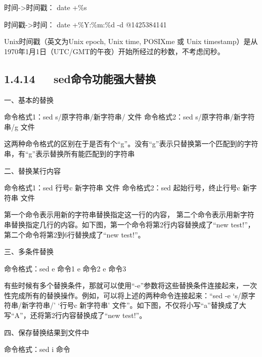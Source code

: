 \documentclass[letterpaper,12pt,english]{sphinxmanual}
\begin{document}
时间-\textgreater{}时间戳： date +\%s

时间戳-\textgreater{}时间： date +\%Y:\%m:\%d -d @1425384141

Unix时间戳（英文为Unix epoch, Unix time, POSIXme 或 Unix timestamp）是从1970年1月1日（UTC/GMT的午夜）开始所经过的秒数，不考虑闰秒。


\subsection{1.4.14   sed命令功能强大替换}
\label{\detokenize{001software/001install/linux:id29}}
一、基本的替换

\begin{sphinxVerbatim}[commandchars=\\\{\}]
命令格式1：sed \PYGZsq{}s/原字符串/新字符串/\PYGZsq{} 文件
命令格式2：sed \PYGZsq{}s/原字符串/新字符串/g\PYGZsq{} 文件
\end{sphinxVerbatim}

这两种命令格式的区别在于是否有个“g”。没有“g”表示只替换第一个匹配到的字符串，有“g”表示替换所有能匹配到的字符串

二、替换某行内容

\begin{sphinxVerbatim}[commandchars=\\\{\}]
命令格式1：sed \PYGZsq{}行号c 新字符串\PYGZsq{} 文件
命令格式2：sed \PYGZsq{}起始行号，终止行号c 新字符串\PYGZsq{} 文件
\end{sphinxVerbatim}

第一个命令表示用新的字符串替换指定这一行的内容， 第二个命令表示用新字符串替换指定几行的内容。如下图，第一个命令将第2行内容替换成了“new test!”，第二个命令将第2到6行替换成了“new test!”。

三、多条件替换

\begin{sphinxVerbatim}[commandchars=\\\{\}]
命令格式：sed \PYGZhy{}e 命令1 \PYGZhy{}e 命令2 \PYGZhy{}e 命令3
\end{sphinxVerbatim}

有些时候有多个替换条件，那就可以使用“-e”参数将这些替换条件连接起来，一次性完成所有的替换操作。例如，可以将上述的两种命令连接起来：“sed -e ‘s/原字符串/新字符串/’ ‘行号c 新字符串’ 文件”。如下图，不仅将小写“a”替换成了大写“A”，还将第2行内容替换成了“new test!”。

四、保存替换结果到文件中

\begin{sphinxVerbatim}[commandchars=\\\{\}]
命令格式：sed \PYGZhy{}i 命令
\end{sphinxVerbatim}
\end{document}
